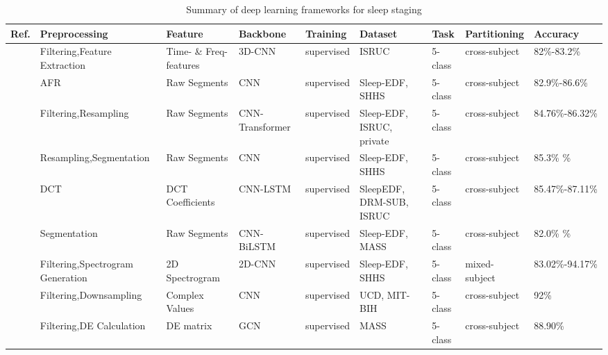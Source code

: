 \begin{table*}[ht]
\renewcommand{\arraystretch}{1.2}
\caption{Summary of deep learning frameworks for sleep staging}
\label{tab:sleeps}
\footnotesize
\begin{tabular}{p{0.4cm}p{2.8cm}p{2cm}p{1.5cm}p{1.9cm}p{1.9cm}p{0.8cm}p{1.8cm}p{2cm}}
\hline
\textbf{Ref.} & \textbf{Preprocessing} & \textbf{Feature} & \textbf{Backbone} & \textbf{Training} & \textbf{Dataset} & \textbf{Task} & \textbf{Partitioning} & \textbf{Accuracy} \\
\hline
~\cite{Sleep1} & Filtering,Feature \newline Extraction & Time- \& Freq- features & 3D-CNN & supervised & ISRUC & 5-class & cross-subject & 82\%-83.2\% \\
~\cite{eldele2021attention} & AFR & Raw Segments & CNN & supervised & Sleep-EDF, \newline SHHS & 5-class & cross-subject & 82.9\%-86.6\% \\
~\cite{Sleep3} & Filtering,Resampling & Raw Segments & CNN-Transformer & supervised & Sleep-EDF, \newline ISRUC, \newline private & 5-class & cross-subject & 84.76\%-86.32\% \\
~\cite{Sleep4} & Resampling,Segmentation & Raw Segments & CNN & supervised & Sleep-EDF, \newline SHHS  & 5-class  & cross-subject & 85.3\% \newline 88.1\% \\
~\cite{Sleep5} & DCT & DCT Coefficients & CNN-LSTM & supervised & SleepEDF, \newline DRM-SUB, \newline ISRUC & 5-class & cross-subject & 85.47\%-87.11\% \\
~\cite{Sleep6} & Segmentation & Raw Segments & CNN-BiLSTM & supervised & Sleep-EDF, \newline MASS & 5-class  & cross-subject & 82.0\% \newline 86.2\% \\
~\cite{Sleep7} & Filtering,Spectrogram Generation & 2D Spectrogram & 2D-CNN & supervised & Sleep-EDF, \newline SHHS & 5-class & mixed-subject & 83.02\%-94.17\% \\
~\cite{Sleep8} & Filtering,Downsampling & Complex Values & CNN & supervised & UCD, \newline MIT-BIH & 5-class & cross-subject & 92\% \\
~\cite{Sleep9} & Filtering,DE Calculation & DE matrix & GCN & supervised & MASS & 5-class  & cross-subject & 88.90\% \\

\end{tabular}
\end{table*}

